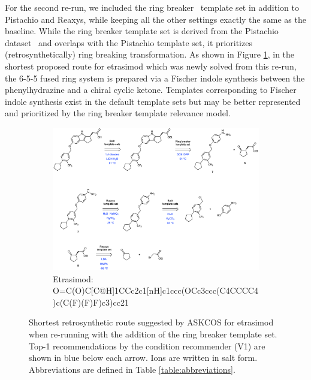 \documentclass[pdflatex,sn-mathphys-num]{sn-jnl}%
\theoremstyle{thmstyleone}%
\theoremstyle{thmstyletwo}%
\theoremstyle{thmstylethree}%
\begin{document}
\clearpage

For the second re-run, we included the ring breaker~\citep{thakkar_ring_2020} template set in addition to Pistachio and Reaxys, while keeping all the other settings exactly the same as the baseline. While the ring breaker template set is derived from the Pistachio dataset~\citep{Pistachio} and overlaps with the Pistachio template set, it prioritizes (retrosynthetically) ring breaking transformation. As shown in Figure \ref{fig:fda_study_interesting_2}, in the shortest proposed route for etrasimod which was newly solved from this re-run, the 6-5-5 fused ring system is prepared via a Fischer indole synthesis between the phenylhydrazine and a chiral cyclic ketone. Templates corresponding to Fischer indole synthesis exist in the default template sets but may be better represented and prioritized by the ring breaker template relevance model.

\begin{figure}[h!]
    \captionsetup[subfigure]{labelformat=empty}
    \begin{subfigure}[t]{1.0\textwidth}
        \includegraphics[scale=0.725]{media/SI_study/3i.etrasimod_i.png}
        \caption{Etrasimod: \\ \small O=C(O)C[C@H]1CCc2c1[nH]c1ccc(OCc3ccc(C4CCCC4)c(C(F)(F)F)c3)cc21}
    \end{subfigure}
    \hfill
    \caption{Shortest retrosynthetic route suggested by ASKCOS for etrasimod when re-running with the addition of the ring breaker template set. Top-1 recommendations by the condition recommender (V1) are shown in blue below each arrow. Ions are written in salt form. Abbreviations are defined in Table \ref{table:abbreviations}.}
    \label{fig:fda_study_interesting_2}
\end{figure}
\end{document}
